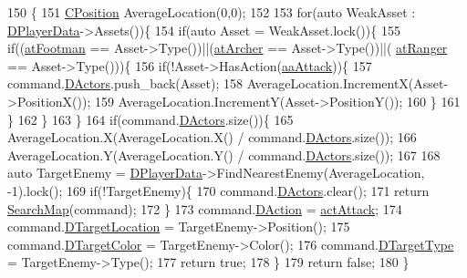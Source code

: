 \begin{DoxyCode}
150                                                            \{
151     \hyperlink{classCPosition}{CPosition} AverageLocation(0,0);
152     
153     \textcolor{keywordflow}{for}(\textcolor{keyword}{auto} WeakAsset : \hyperlink{classCAIPlayer_a83b5113c8f7e80df54940b647c5ee2e6}{DPlayerData}->Assets())\{
154         \textcolor{keywordflow}{if}(\textcolor{keyword}{auto} Asset = WeakAsset.lock())\{
155             \textcolor{keywordflow}{if}((\hyperlink{GameDataTypes_8h_a5600d4fc433b83300308921974477fecad586e8ff9ee846d22630c2066e8fb7c2}{atFootman} == Asset->Type())||(\hyperlink{GameDataTypes_8h_a5600d4fc433b83300308921974477feca7fad0074234068ff0af4092a75b929f8}{atArcher} == Asset->Type())||(
      \hyperlink{GameDataTypes_8h_a5600d4fc433b83300308921974477fecaafd2b1e0ca34872bb06098dbec9939e0}{atRanger} == Asset->Type()))\{
156                 \textcolor{keywordflow}{if}(!Asset->HasAction(\hyperlink{GameDataTypes_8h_ab47668e651a3032cfb9c40ea2d60d670a948eefd20b9e43d3b4cfcf613774716d}{aaAttack}))\{
157                     command.\hyperlink{structSPlayerCommandRequest_aa37fc01519676345703d78b9f573894a}{DActors}.push\_back(Asset);
158                     AverageLocation.IncrementX(Asset->PositionX());
159                     AverageLocation.IncrementY(Asset->PositionY());
160                 \}
161             \}
162         \}
163     \}
164     \textcolor{keywordflow}{if}(command.\hyperlink{structSPlayerCommandRequest_aa37fc01519676345703d78b9f573894a}{DActors}.size())\{
165         AverageLocation.X(AverageLocation.X() / command.\hyperlink{structSPlayerCommandRequest_aa37fc01519676345703d78b9f573894a}{DActors}.size());
166         AverageLocation.Y(AverageLocation.Y() / command.\hyperlink{structSPlayerCommandRequest_aa37fc01519676345703d78b9f573894a}{DActors}.size());
167         
168         \textcolor{keyword}{auto} TargetEnemy = \hyperlink{classCAIPlayer_a83b5113c8f7e80df54940b647c5ee2e6}{DPlayerData}->FindNearestEnemy(AverageLocation, -1).lock();
169         \textcolor{keywordflow}{if}(!TargetEnemy)\{
170             command.\hyperlink{structSPlayerCommandRequest_aa37fc01519676345703d78b9f573894a}{DActors}.clear();
171             \textcolor{keywordflow}{return} \hyperlink{classCAIPlayer_afafbe8fc589e09a16ae1f02f2794d7b0}{SearchMap}(command);
172         \}
173         command.\hyperlink{structSPlayerCommandRequest_a80897bbccf2c4e0b148a7aa815a926c6}{DAction} = \hyperlink{GameDataTypes_8h_a35b98ce26aca678b03c6f9f76e4778ceaf90bc0c36c70d816217d0d4b08b0ba4c}{actAttack};
174         command.\hyperlink{structSPlayerCommandRequest_a701702b94ca2fd2738e95ef6711dd41a}{DTargetLocation} = TargetEnemy->Position();
175         command.\hyperlink{structSPlayerCommandRequest_a3690a5117efe6214d92f18d672b5714f}{DTargetColor} = TargetEnemy->Color();
176         command.\hyperlink{structSPlayerCommandRequest_a864e47c641127665751091876a6d3c5e}{DTargetType} = TargetEnemy->Type(); 
177         \textcolor{keywordflow}{return} \textcolor{keyword}{true};
178     \}
179     \textcolor{keywordflow}{return} \textcolor{keyword}{false};    
180 \}
\end{DoxyCode}
